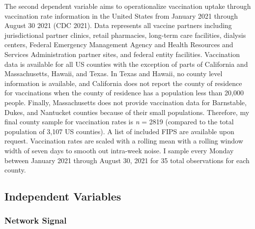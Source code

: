 The second dependent variable aims to operationalize vaccination uptake through
vaccination rate information in the United States from January 2021 through
August 30 2021 (CDC 2021). Data represents all vaccine partners including
jurisdictional partner clinics, retail pharmacies, long-term care facilities,
dialysis centers, Federal Emergency Management Agency and Health Resources and
Services Administration partner sites, and federal entity facilities.
Vaccination data is available for all US counties with the exception of parts of
California and Massachusetts, Hawaii, and Texas. In Texas and Hawaii, no county
level information is available, and California does not report the county of
residence for vaccinations when the county of residence has a population less
than 20,000 people. Finally, Massachusetts does not provide vaccination data for
Barnstable, Dukes, and Nantucket counties because of their small populations.
Therefore, my final county sample for vaccination rates is \emph{n} = 2819
(compared to the total population of 3,107 US counties). A list of included FIPS
are available upon request. Vaccination rates are scaled with a rolling mean
with a rolling window width of seven days to smooth out intra-week noise. I
sample every Monday between January 2021 through August 30, 2021 for 35 total
observations for each county.

\hypertarget{independent-variables-1}{%
\subsection{Independent Variables}\label{independent-variables-1}}

\hypertarget{network-signal}{%
\subsubsection{Network Signal}\label{network-signal}}

